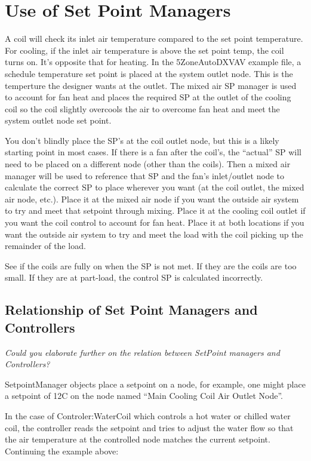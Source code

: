\section{Use of Set Point Managers}\label{use-of-set-point-managers}

A coil will check its inlet air temperature compared to the set point temperature. For cooling, if the inlet air temperature is above the set point temp, the coil turns on. It's opposite that for heating. In the 5ZoneAutoDXVAV example file, a schedule temperature set point is placed at the system outlet node. This is the temperture the designer wants at the outlet. The mixed air SP manager is used to account for fan heat and places the required SP at the outlet of the cooling coil so the coil slightly overcools the air to overcome fan heat and meet the system outlet node set point.

You don't blindly place the SP's at the coil outlet node, but this is a likely starting point in most cases. If there is a fan after the coil's, the ``actual'' SP will need to be placed on a different node (other than the coils). Then a mixed air manager will be used to reference that SP and the fan's inlet/outlet node to calculate the correct SP to place wherever you want (at the coil outlet, the mixed air node, etc.). Place it at the mixed air node if you want the outside air system to try and meet that setpoint through mixing. Place it at the cooling coil outlet if you want the coil control to account for fan heat. Place it at both locations if you want the outside air system to try and meet the load with the coil picking up the remainder of the load.

See if the coils are fully on when the SP is not met. If they are the coils are too small. If they are at part-load, the control SP is calculated incorrectly.

\subsection{Relationship of Set Point Managers and Controllers}\label{relationship-of-set-point-managers-and-controllers}

\emph{Could you elaborate further on the relation between SetPoint managers and Controllers?}

SetpointManager objects place a setpoint on a node, for example, one might place a setpoint of 12C on the node named ``Main Cooling Coil Air Outlet Node''.

In the case of Controler:WaterCoil which controls a hot water or chilled water coil, the controller reads the setpoint and tries to adjust the water flow so that the air temperature at the controlled node matches the current setpoint.~ Continuing the example above:

